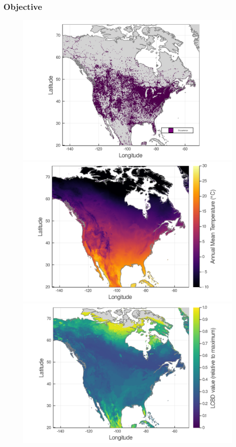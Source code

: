 \documentclass[10pt]{beamer}
\begin{document}
\begin{frame}
  \frametitle{Objective}
  \begin{figure}
    \centering
    \hspace*{-0cm}\includegraphics[scale=0.05]{fig/01_raw_singlesp.png}
    \hspace*{0cm}\includegraphics[scale=0.05]{fig/wc_temp.png}
    \vfill
    \includegraphics[scale=0.10]{fig/05_sdm_lcbd.png}
  \end{figure}
\end{frame}
\end{document}
